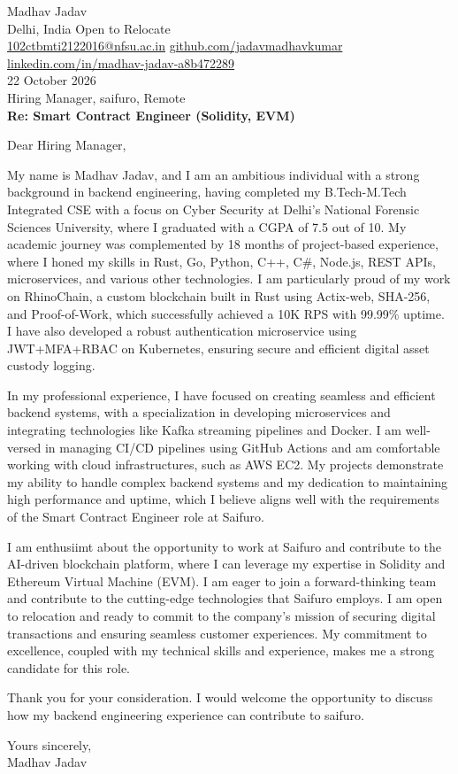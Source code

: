 \documentclass[10pt,letterpaper]{article}
\begin{document}
\begin{flushleft}
Madhav Jadav\\
Delhi, India \textbar{} Open to Relocate\\
\href{mailto:102ctbmti2122016@nfsu.ac.in}{102ctbmti2122016@nfsu.ac.in} \textbar{} \href{https://github.com/jadavmadhavkumar}{github.com/jadavmadhavkumar} \textbar{} \href{https://www.linkedin.com/in/madhav-jadav-a8b472289}{linkedin.com/in/madhav-jadav-a8b472289}\\[8pt]
22 October 2026\\[4pt]
Hiring Manager, saifuro, Remote\\[8pt]
\textbf{Re: Smart Contract Engineer (Solidity, EVM)}\\[8pt]
\end{flushleft}
Dear Hiring Manager,

My name is Madhav Jadav, and I am an ambitious individual with a strong background in backend engineering, having completed my B.Tech-M.Tech Integrated CSE with a focus on Cyber Security at Delhi's National Forensic Sciences University, where I graduated with a CGPA of 7.5 out of 10. My academic journey was complemented by 18 months of project-based experience, where I honed my skills in Rust, Go, Python, C++, C\#, Node.js, REST APIs, microservices, and various other technologies. I am particularly proud of my work on RhinoChain, a custom blockchain built in Rust using Actix-web, SHA-256, and Proof-of-Work, which successfully achieved a 10K RPS with 99.99\% uptime. I have also developed a robust authentication microservice using JWT+MFA+RBAC on Kubernetes, ensuring secure and efficient digital asset custody logging.

In my professional experience, I have focused on creating seamless and efficient backend systems, with a specialization in developing microservices and integrating technologies like Kafka streaming pipelines and Docker. I am well-versed in managing CI/CD pipelines using GitHub Actions and am comfortable working with cloud infrastructures, such as AWS EC2. My projects demonstrate my ability to handle complex backend systems and my dedication to maintaining high performance and uptime, which I believe aligns well with the requirements of the Smart Contract Engineer role at Saifuro.

I am enthusiimt about the opportunity to work at Saifuro and contribute to the AI-driven blockchain platform, where I can leverage my expertise in Solidity and Ethereum Virtual Machine (EVM). I am eager to join a forward-thinking team and contribute to the cutting-edge technologies that Saifuro employs. I am open to relocation and ready to commit to the company's mission of securing digital transactions and ensuring seamless customer experiences. My commitment to excellence, coupled with my technical skills and experience, makes me a strong candidate for this role.

Thank you for your consideration. I would welcome the opportunity to discuss how my backend engineering experience can contribute to saifuro.

Yours sincerely,\\[8pt]
Madhav Jadav
\end{document}
